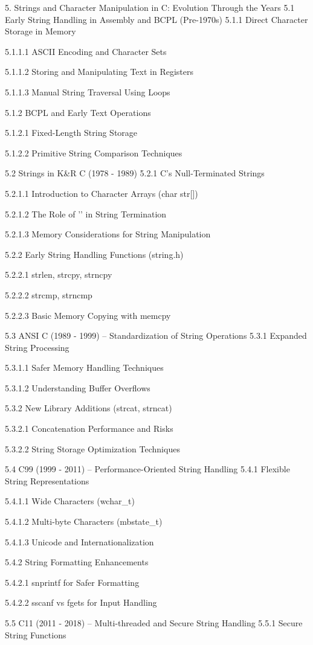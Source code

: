 5. Strings and Character Manipulation in C: Evolution Through the Years
5.1 Early String Handling in Assembly and BCPL (Pre-1970s)
5.1.1 Direct Character Storage in Memory

5.1.1.1 ASCII Encoding and Character Sets

5.1.1.2 Storing and Manipulating Text in Registers

5.1.1.3 Manual String Traversal Using Loops

5.1.2 BCPL and Early Text Operations

5.1.2.1 Fixed-Length String Storage

5.1.2.2 Primitive String Comparison Techniques

5.2 Strings in K&R C (1978 - 1989)
5.2.1 C’s Null-Terminated Strings

5.2.1.1 Introduction to Character Arrays (char str[])

5.2.1.2 The Role of '\0' in String Termination

5.2.1.3 Memory Considerations for String Manipulation

5.2.2 Early String Handling Functions (string.h)

5.2.2.1 strlen, strcpy, strncpy

5.2.2.2 strcmp, strncmp

5.2.2.3 Basic Memory Copying with memcpy

5.3 ANSI C (1989 - 1999) – Standardization of String Operations
5.3.1 Expanded String Processing

5.3.1.1 Safer Memory Handling Techniques

5.3.1.2 Understanding Buffer Overflows

5.3.2 New Library Additions (strcat, strncat)

5.3.2.1 Concatenation Performance and Risks

5.3.2.2 String Storage Optimization Techniques

5.4 C99 (1999 - 2011) – Performance-Oriented String Handling
5.4.1 Flexible String Representations

5.4.1.1 Wide Characters (wchar_t)

5.4.1.2 Multi-byte Characters (mbstate_t)

5.4.1.3 Unicode and Internationalization

5.4.2 String Formatting Enhancements

5.4.2.1 snprintf for Safer Formatting

5.4.2.2 sscanf vs fgets for Input Handling

5.5 C11 (2011 - 2018) – Multi-threaded and Secure String Handling
5.5.1 Secure String Functions

